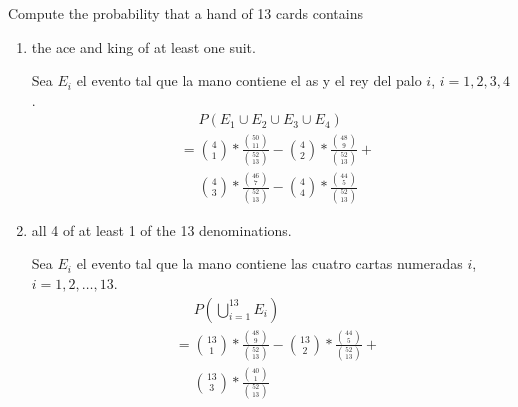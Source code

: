 \item Compute the probability that a hand of 13 cards contains
\begin{enumerate}
    \item the ace and king of at least one suit.
    
    Sea $E_i$ el evento tal que la mano contiene el as y el rey del palo $i$, $i = 1,2,3,4$.
    \begin{align*}
        &\phantom{{}={}} P(E_1\cup E_2\cup E_3\cup E_4)\\
        &= \binom{4}{1} * \frac{\binom{50}{11}}{\binom{52}{13}}
        -  \binom{4}{2} * \frac{\binom{48}{ 9}}{\binom{52}{13}} + {}\\
        &\phantom{{}={}}
           \binom{4}{3} * \frac{\binom{46}{ 7}}{\binom{52}{13}} -
           \binom{4}{4} * \frac{\binom{44}{ 5}}{\binom{52}{13}}
    \end{align*}
    \item all 4 of at least 1 of the 13 denominations.

    Sea $E_i$ el evento tal que la mano contiene las cuatro cartas numeradas $i$, $i = 1,2,\dots,13$.
    \begin{align*}
        &\phantom{{}={}} P(\textstyle \bigcup_{i=1}^{13} E_i)\\
        &= \binom{13}{1} * \frac{\binom{48}{9}}{\binom{52}{13}}
        -  \binom{13}{2} * \frac{\binom{44}{ 5}}{\binom{52}{13}} + {}\\
        &\phantom{{}={}}
           \binom{13}{3} * \frac{\binom{40}{ 1}}{\binom{52}{13}}
    \end{align*}
\end{enumerate}